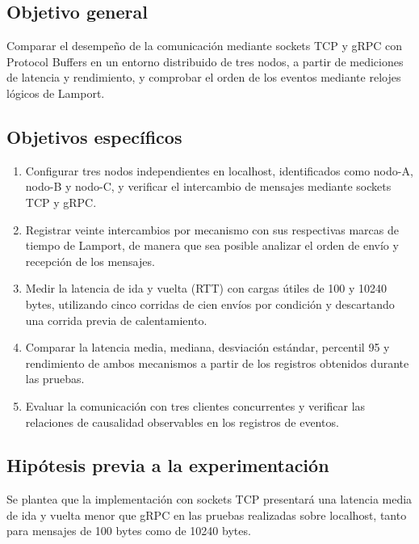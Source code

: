 
\subsection{Objetivo general}

Comparar el desempeño de la comunicación mediante sockets
TCP y gRPC con Protocol Buffers en un entorno distribuido
de tres nodos, a partir de mediciones de latencia y
rendimiento, y comprobar el orden de los eventos mediante
relojes lógicos de Lamport.

\subsection{Objetivos específicos}

\begin{enumerate}

    \item Configurar tres nodos independientes en
    localhost, identificados como nodo-A, nodo-B y
    nodo-C, y verificar el intercambio de mensajes
    mediante sockets TCP y gRPC.

    \item Registrar veinte intercambios por mecanismo
    con sus respectivas marcas de tiempo de Lamport,
    de manera que sea posible analizar el orden
    de envío y recepción de los mensajes.

    \item Medir la latencia de ida y vuelta (RTT)
    con cargas útiles de 100 y 10240 bytes,
    utilizando cinco corridas de cien envíos
    por condición y descartando una corrida
    previa de calentamiento.

    \item Comparar la latencia media, mediana,
    desviación estándar, percentil 95 y rendimiento
    de ambos mecanismos a partir de los registros
    obtenidos durante las pruebas.

    \item Evaluar la comunicación con tres clientes
    concurrentes y verificar las relaciones de
    causalidad observables en los registros de
    eventos.

\end{enumerate}

\subsection{Hipótesis previa a la experimentación}

Se plantea que la implementación con sockets TCP
presentará una latencia media de ida y vuelta menor
que gRPC en las pruebas realizadas sobre localhost,
tanto para mensajes de 100 bytes como de 10240 bytes.

